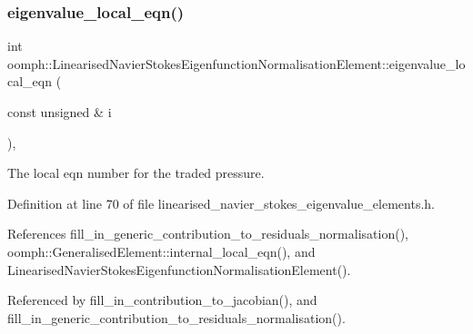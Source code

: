 \subsubsection{\texorpdfstring{eigenvalue\+\_\+local\+\_\+eqn()}{eigenvalue\_local\_eqn()}}
{\footnotesize\ttfamily int oomph\+::\+Linearised\+Navier\+Stokes\+Eigenfunction\+Normalisation\+Element\+::eigenvalue\+\_\+local\+\_\+eqn (\begin{DoxyParamCaption}\item[{const unsigned \&}]{i }\end{DoxyParamCaption})\hspace{0.3cm}{\ttfamily [inline]}, {\ttfamily [private]}}



The local eqn number for the traded pressure. 



Definition at line 70 of file linearised\+\_\+navier\+\_\+stokes\+\_\+eigenvalue\+\_\+elements.\+h.



References fill\+\_\+in\+\_\+generic\+\_\+contribution\+\_\+to\+\_\+residuals\+\_\+normalisation(), oomph\+::\+Generalised\+Element\+::internal\+\_\+local\+\_\+eqn(), and Linearised\+Navier\+Stokes\+Eigenfunction\+Normalisation\+Element().



Referenced by fill\+\_\+in\+\_\+contribution\+\_\+to\+\_\+jacobian(), and fill\+\_\+in\+\_\+generic\+\_\+contribution\+\_\+to\+\_\+residuals\+\_\+normalisation().

\mbox{\label{classoomph_1_1LinearisedNavierStokesEigenfunctionNormalisationElement_a6493569eee1886773a37e5d2641a981c}} 
